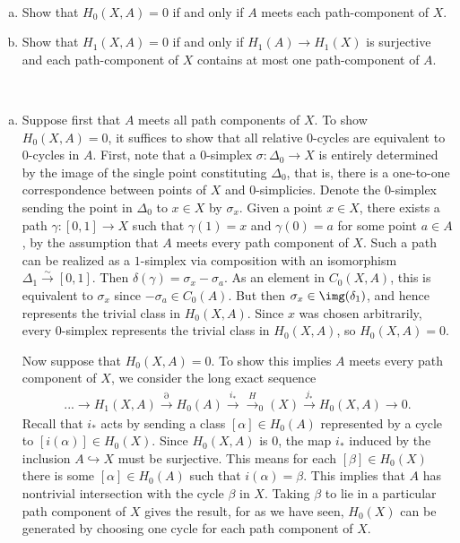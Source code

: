 \begin{homework}[e]
  $ $
  \begin{enumerate}[(a)]
    \item Show that $H_0(X,A) = 0$ if and only if $A$ meets each path-component of $X$.
    \item Show that $H_1(X,A) = 0$ if and only if $H_1(A) \to H_1(X)$ is surjective and each path-component of $X$ contains at most one path-component of $A$.
  \end{enumerate}
  \begin{prf}$ $
    \begin{enumerate}[(a)]
      \item Suppose first that $A$ meets all path components of $X$. To show $H_0(X,A) = 0$, it suffices to show that all relative $0$-cycles are equivalent to $0$-cycles in $A$. First, note that a $0$-simplex $\sigma:\Delta_0\to X$ is entirely determined by the image of the single point constituting $\Delta_0$, that is, there is a one-to-one correspondence between points of $X$ and $0$-simplicies. Denote the $0$-simplex sending the point in $\Delta_0$ to $x \in X$ by $\sigma_x$. Given a point $x\in X$, there exists a path $\gamma:[0,1]\to X$ such that $\gamma(1) = x$ and $\gamma(0) = a$ for some point $a \in A$, by the assumption that $A$ meets every path component of $X$. Such a path can be realized as a $1$-simplex via composition with an isomorphism $\Delta_1\xrightarrow{\sim} [0,1]$. Then $\delta(\gamma) = \sigma_x - \sigma_a$. As an element in $C_0(X,A)$, this is equivalent to $\sigma_x$ since $-\sigma_a \in C_0(A)$. But then $\sigma_x \in \img(\delta_1)$, and hence represents the trivial class in $H_0(X,A)$. Since $x$ was chosen arbitrarily, every $0$-simplex represents the trivial class in $H_0(X,A)$, so $H_0(X,A) = 0$.

        Now suppose that $H_0(X,A) = 0$. To show this implies $A$ meets every path component of $X$, we consider the long exact sequence
        \begin{align*}
          ... \to H_1(X,A) \xrightarrow{\partial} H_0(A) \xrightarrow{i_*} \xrightarrow H_0(X) \xrightarrow{j_*} H_0(X,A) \to 0.
        \end{align*}
        Recall that $i_*$ acts by sending a class $[\alpha] \in H_0(A)$ represented by a cycle to $[i(\alpha)] \in H_0(X)$. Since $H_0(X,A)$ is $0$, the map $i_*$ induced by the inclusion $A\hookrightarrow X$ must be surjective. This means for each $[\beta]\in H_0(X)$ there is some $[\alpha]\in H_0(A)$ such that $i(\alpha) = \beta$. This implies that $A$ has nontrivial intersection with the cycle $\beta$ in $X$. Taking $\beta$ to lie in a particular path component of $X$ gives the result, for as we have seen, $H_0(X)$ can be generated by choosing one cycle for each path component of $X$.


\end{enumerate}
\end{prf}
\end{homework}
